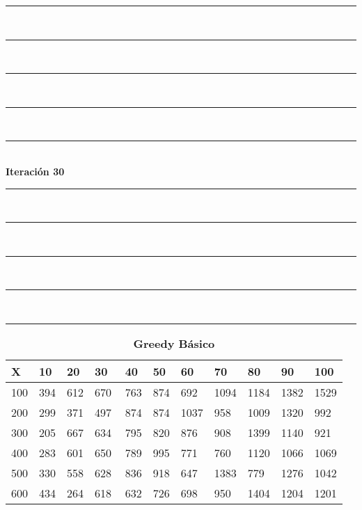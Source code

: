 \documentclass[10pt,letterpaper]{article}
\begin{document}
\newpage 
\begin{center}
\newcommand{\HRule}{\rule{\linewidth}{0.5mm}}
\center
\HRule\\[6cm]
\HRule\\[0.4cm]
\HRule\\[0.4cm]
\HRule\\[0.4cm]
\HRule\\[0.4cm]
{\centering \Huge\bfseries Iteración 30}\\[0.4cm]
\HRule\\[0.4cm]
\HRule\\[0.4cm]
\HRule\\[0.4cm]
\HRule\\[6cm]
\HRule
\end{center}
\newpage 
{}
\begin{center}
\begin{table}\renewcommand{\arraystretch}{2.5}
\caption{\large \textbf{Greedy Básico}}
\centering
\begin{tabular} { |m{0.5cm}|m{1.3cm}|m{1.3cm}|m{1.3cm}|m{1.3cm}|m{1.3cm}|m{1.3cm}|m{1.3cm}|m{1.3cm}|m{1.3cm}|m{1.3cm}|} 
\hline
\rowcolor{Gray}
\centering \textbf{X} & \centering \textbf{10} & \centering \textbf{20} & \centering \textbf{30}\ & \centering \textbf{40} & \centering \textbf{50} & \centering \textbf{60}\ & \centering \textbf{70} & \centering \textbf{80} & \centering \textbf{90}\ & \textbf{100} \\\hline
\cellcolor{Gray}100 & \Large 394 & \Large 612 & \Large 670 & \Large 763 & \Large 874 & \Large 692 & \Large 1094 & \Large 1184 & \Large 1382 & \Large 1529 \\
\hline
\cellcolor{Gray}200 & \Large 299 & \Large 371 & \Large 497 & \Large 874 & \Large 874 & \Large 1037 & \Large 958 & \Large 1009 & \Large 1320 & \Large 992 \\
\hline
\cellcolor{Gray}300 & \Large 205 & \Large 667 & \Large 634 & \Large 795 & \Large 820 & \Large 876 & \Large 908 & \Large 1399 & \Large 1140 & \Large 921 \\
\hline
\cellcolor{Gray}400 & \Large 283 & \Large 601 & \Large 650 & \Large 789 & \Large 995 & \Large 771 & \Large 760 & \Large 1120 & \Large 1066 & \Large 1069 \\
\hline
\cellcolor{Gray}500 & \Large 330 & \Large 558 & \Large 628 & \Large 836 & \Large 918 & \Large 647 & \Large 1383 & \Large 779 & \Large 1276 & \Large 1042 \\
\hline
\cellcolor{Gray}600 & \Large 434 & \Large 264 & \Large 618 & \Large 632 & \Large 726 & \Large 698 & \Large 950 & \Large 1404 & \Large 1204 & \Large 1201 \\

\end{tabular}
\end{table}
\end{center}
\end{document}
